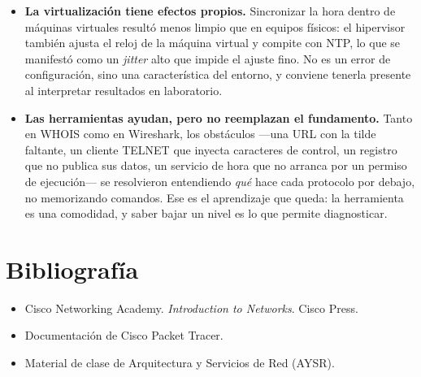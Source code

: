 \documentclass[11pt,a4paper]{report}
\begin{document}
\begin{itemize}
  \item \textbf{La virtualización tiene efectos propios.} Sincronizar la hora
        dentro de máquinas virtuales resultó menos limpio que en equipos físicos:
        el hipervisor también ajusta el reloj de la máquina virtual y compite con
        NTP, lo que se manifestó como un \emph{jitter} alto que impide el ajuste
        fino. No es un error de configuración, sino una característica del entorno,
        y conviene tenerla presente al interpretar resultados en laboratorio.

  \item \textbf{Las herramientas ayudan, pero no reemplazan el fundamento.} Tanto
        en WHOIS como en Wireshark, los obstáculos ---una URL con la tilde
        faltante, un cliente TELNET que inyecta caracteres de control, un registro
        que no publica sus datos, un servicio de hora que no arranca por un permiso
        de ejecución--- se resolvieron entendiendo \emph{qué} hace cada protocolo
        por debajo, no memorizando comandos. Ese es el aprendizaje que queda: la
        herramienta es una comodidad, y saber bajar un nivel es lo que permite
        diagnosticar.
\end{itemize}

\section{Bibliografía}

\begin{itemize}
  \item Cisco Networking Academy. \emph{Introduction to Networks}. Cisco Press.
  \item Documentación de Cisco Packet Tracer.
  \item Material de clase de Arquitectura y Servicios de Red (AYSR).
\end{itemize}
\end{document}
